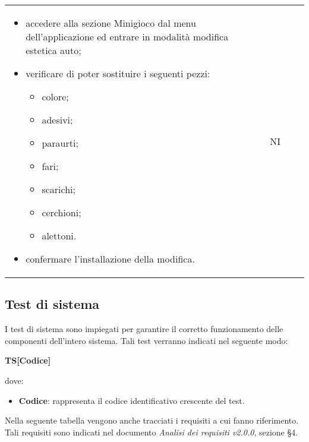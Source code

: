 \begin{longtable}{ >{\centering}p{} >{\centering}p{} >{\centering}p{}
			>{\centering}p{}}
		 \begin{itemize}
		 	\item accedere alla sezione Minigioco dal menu dell'applicazione ed entrare in modalità modifica estetica auto;
		 	\item verificare di poter sostituire i seguenti pezzi:
		 		\begin{itemize}
		 			\item colore;
		 			\item adesivi;
		 			\item paraurti;
		 			\item fari;
		 			\item scarichi;
		 			\item cerchioni;
		 			\item alettoni.
		 		\end{itemize}
		 	\item confermare l'installazione della modifica.
		 \end{itemize}	&	NI	\tabularnewline
\end{longtable}
\newpage
\subsection{Test di sistema}
I test di sistema sono impiegati per garantire il corretto funzionamento delle componenti dell'intero sistema. Tali test verranno indicati nel seguente modo:\\
	\centerline{\textbf{TS[Codice]}}
dove:
\begin{itemize}
	\item \textbf{Codice}: rappresenta il codice identificativo crescente del test.
\end{itemize}
	Nella seguente tabella vengono anche tracciati i requisiti a cui fanno riferimento. Tali requisiti sono indicati nel documento \textit{Analisi dei requisiti v2.0.0}, sezione §4.

	\renewcommand{\arraystretch}{1.5}
	
